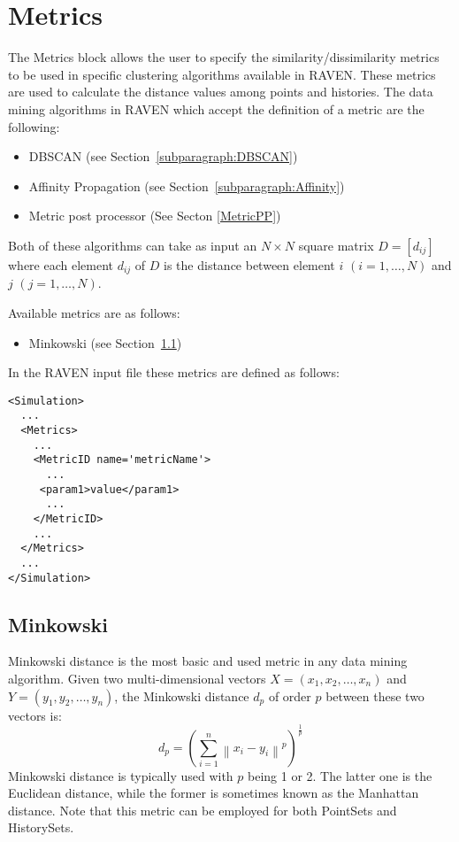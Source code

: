 \section{Metrics}
\label{sec:Metrics}

The Metrics block allows the user to specify the similarity/dissimilarity metrics to be used in specific clustering algorithms available in RAVEN.
These metrics are used to calculate the distance values among points and histories.
The data mining algorithms in RAVEN which accept the definition of a metric are the following:
\begin{itemize}
  \item DBSCAN (see Section~\ref{subparagraph:DBSCAN})
  \item Affinity Propagation (see Section~\ref{subparagraph:Affinity})
  \item Metric post processor (See Secton \ref{MetricPP})
\end{itemize}
Both of these algorithms can take as input an $N \times N$ square matrix $D=[d_{ij}]$ where each element $d_{ij}$ of $D$ is the distance between
element $i$ $(i=1,\ldots,N)$ and $j$
$(j=1,\ldots,N)$.

Available metrics are as follows:
\begin{itemize}
  \item Minkowski (see Section~\ref{subsection:Minkowski})
\end{itemize}

In the RAVEN input file these metrics are defined as follows:
\begin{lstlisting}[style=XML]
<Simulation>
  ...
  <Metrics>
    ...
    <MetricID name='metricName'>
      ...
     <param1>value</param1>
      ...
    </MetricID>
    ...
  </Metrics>
  ...
</Simulation>
\end{lstlisting}

\subsection{Minkowski}
\label{subsection:Minkowski}
Minkowski distance is the most basic and used metric in any data mining algorithm.
Given two multi-dimensional vectors $X=(x_1,x_2,\ldots,x_n)$ and $Y=(y_1,y_2,\ldots,y_n)$, the Minkowski distance $d_p$ of order $p$ between these
two vectors is:
\begin{equation}
d_p = \left ( \sum_{i=1}^{n} \left \| x_i-y_i \right \|^p \right )^\frac{1}{p}
\end{equation}
Minkowski distance is typically used with $p$ being 1 or 2. The latter one is the Euclidean distance, while the former is sometimes known as the
Manhattan distance.
Note that this metric can be employed for both PointSets and HistorySets.

